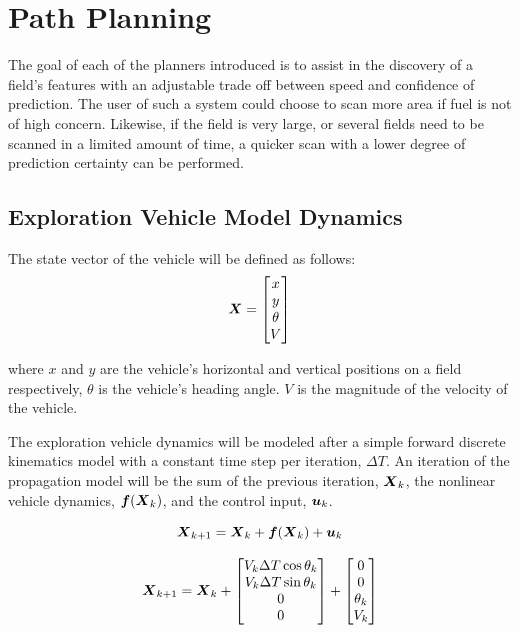 \chapter{Path Planning} \label{ch:pp}
The goal of each of the planners introduced is to assist in the discovery of a field's features with an adjustable trade off between speed and confidence of prediction. The user of such a system could choose to scan more area if fuel is not of high concern. Likewise, if the field is very large, or several fields need to be scanned in a limited amount of time, a quicker scan with a lower degree of prediction certainty can be performed.

\section{Exploration Vehicle Model Dynamics} \label{sec:vehicledynamics}
The state vector of the vehicle will be defined as follows:
\begin{equation}
{\it{\boldsymbol{X}}} = \begin{bmatrix}
	x \\
	y \\
	\theta \\
	V
\end{bmatrix}
\label{eq:vehiclemodel}
\end{equation}

\noindent where $x$ and $y$ are the vehicle's horizontal and vertical positions on a field respectively, $\theta$ is the vehicle's heading angle. $V$ is the magnitude of the velocity of the vehicle.

The exploration vehicle dynamics will be modeled after a simple forward discrete kinematics model with a constant time step per iteration, $\Delta T$. An iteration of the propagation model will be the sum of the previous iteration, ${\it{\boldsymbol{X}}}_{k}$, the nonlinear vehicle dynamics, ${\it{\boldsymbol{f}}}({\it{\boldsymbol{X}}}_k)$, and the control input, ${\it{\boldsymbol{u}}}_k$.

\begin{equation}
	{\it{\boldsymbol{X}}}_{k+1} = {\it{\boldsymbol{X}}}_k + {\it{\boldsymbol{f}}}({\it{\boldsymbol{X}}}_{k}) + {\it{\boldsymbol{u}}}_k
	\label{eq:vehicledynamicsform}
\end{equation}

\begin{equation}
	{\it{\boldsymbol{X}}}_{k+1} = {\it{\boldsymbol{X}}}_k + \begin{bmatrix}
		V_k \Delta T \cos \theta_k \\
		V_k \Delta T \sin \theta_k \\
		0 \\
		0
	\end{bmatrix} + \begin{bmatrix}
	0 \\
	0 \\
	\theta_k \\
	V_k
	\end{bmatrix}
	\label{eq:vehicledynamicsmodel}
\end{equation}

